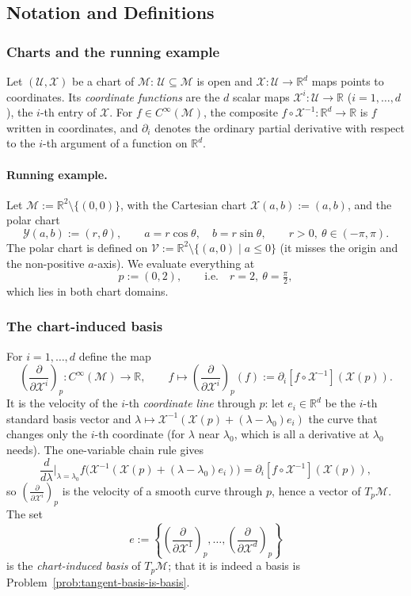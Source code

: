 \documentclass[11pt]{article}
\newcommand{\TpM}{T_p\mathcal M}
\newcommand{\Cinf}{C^\infty(\mathcal M)}
\begin{document}
\subsection*{Notation and Definitions}

\subsubsection*{Charts and the running example}
Let $(\mathcal U,\mathcal X)$ be a chart of $\mathcal M$: $\mathcal U\subseteq\mathcal M$ is open and $\mathcal X:\mathcal U\to\mathbb R^d$ maps points to coordinates. Its \emph{coordinate functions} are the $d$ scalar maps $\mathcal X^i:\mathcal U\to\mathbb R$ ($i=1,\dots,d$), the $i$-th entry of $\mathcal X$. For $f\in\Cinf$, the composite $f\circ\mathcal X^{-1}:\mathbb R^d\to\mathbb R$ is $f$ written in coordinates, and $\partial_i$ denotes the ordinary partial derivative with respect to the $i$-th argument of a function on $\mathbb R^d$.

\paragraph{Running example.} Let $\mathcal M:=\mathbb R^2\setminus\{(0,0)\}$, with the Cartesian chart $\mathcal X(a,b):=(a,b)$, and the polar chart
\[
\mathcal Y(a,b):=(r,\theta),\qquad a=r\cos\theta,\quad b=r\sin\theta,\qquad r>0,\ \theta\in(-\pi,\pi).
\]
The polar chart is defined on $\mathcal V:=\mathbb R^2\setminus\{(a,0)\mid a\le0\}$ (it misses the origin and the non-positive $a$-axis). We evaluate everything at
\[
p:=(0,2),\qquad\text{i.e.}\quad r=2,\ \theta=\tfrac\pi2,
\]
which lies in both chart domains.

\subsubsection*{The chart-induced basis}
For $i=1,\dots,d$ define the map
\[
\left(\frac{\partial}{\partial\mathcal X^i}\right)_p:\Cinf\longrightarrow\mathbb R,\qquad f\longmapsto\left(\frac{\partial}{\partial\mathcal X^i}\right)_p(f):=\partial_i[f\circ\mathcal X^{-1}](\mathcal X(p)).
\]
It is the velocity of the $i$-th \emph{coordinate line} through $p$: let $e_i\in\mathbb R^d$ be the $i$-th standard basis vector and $\lambda\mapsto\mathcal X^{-1}(\mathcal X(p)+(\lambda-\lambda_0)e_i)$ the curve that changes only the $i$-th coordinate (for $\lambda$ near $\lambda_0$, which is all a derivative at $\lambda_0$ needs). The one-variable chain rule gives
\[
\frac{d}{d\lambda}\Big|_{\lambda=\lambda_0}f\big(\mathcal X^{-1}(\mathcal X(p)+(\lambda-\lambda_0)e_i)\big)=\partial_i[f\circ\mathcal X^{-1}](\mathcal X(p)),
\]
so $\left(\frac{\partial}{\partial\mathcal X^i}\right)_p$ is the velocity of a smooth curve through $p$, hence a vector of $\TpM$. The set
\[
e:=\left\{\left(\frac{\partial}{\partial\mathcal X^1}\right)_p,\dots,\left(\frac{\partial}{\partial\mathcal X^d}\right)_p\right\}
\]
is the \emph{chart-induced basis} of $\TpM$; that it is indeed a basis is Problem~\ref{prob:tangent-basis-is-basis}.
\end{document}
